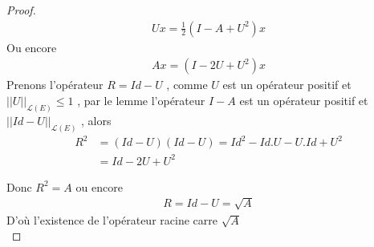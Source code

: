 \documentclass{report}
\begin{document}
{\begin{proof}
									\begin{align*}
					 U x = \frac{1}{2} (I - A + U^2)x 
									\end{align*}
Ou encore 
									\begin{align*}
					 A x = (I - 2U + U^2)x 
									\end{align*}
Prenons l'opérateur $R = Id - U$ , comme $U$ est un opérateur positif et $||U||_{\mathscr{L}(E)} \le 1$ , par le lemme l'opérateur $I - A$ est un opérateur positif et $||Id - U||_{\mathscr{L}(E)}$ , alors 
									\begin{align*}
					 R^2 &= (Id - U)(Id - U) = Id^2 -Id.U -U.Id + U^2 \\
					 &= Id - 2U + U^2
									\end{align*}



Donc $R^2 = A$ ou encore 
									\begin{align*}
					 R = Id - U = \sqrt{A}
									\end{align*}
D'où l'existence de l'opérateur racine carre $\sqrt{A}$ \\


\end{proof}}
\end{document}
